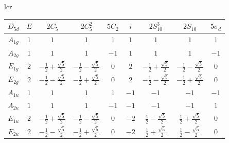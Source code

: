 \documentclass[landscape]{article}
\begin{document}
\begin{center}
        \begin{tabular}{lcr}
            \begin{minipage}[c]{0.4\linewidth}
                \begin{center}
                    \begin{tabular}{c|cccccccc}
                        $D_{5d}$ & $E$ & $2C_5$ & $2C_5^2$ & $5C_2$ & $i$ & $2S_{10}^3$ & $2S_{10}$ & $5\sigma_d$\\
                        \hline
                        $A_{1g}$ & $1$ & $1$ & $1$ & $1$ & $1$ & $1$ & $1$ & $1$\\
                        $A_{2g}$ & $1$ & $1$ & $1$ & $-1$ & $1$ & $1$ & $1$ & $-1$\\
                        $E_{1g}$ & $2$ & $-\frac12+\frac{\sqrt{5}}{2}$ & $-\frac12-\frac{\sqrt{5}}{2}$ & $0$ & $2$ & $-\frac12+\frac{\sqrt{5}}{2}$ & $-\frac12-\frac{\sqrt{5}}{2}$ & $0$\\
                        $E_{2g}$ & $2$ & $-\frac12-\frac{\sqrt{5}}{2}$ & $-\frac12+\frac{\sqrt{5}}{2}$ & $0$ & $2$ & $-\frac12-\frac{\sqrt{5}}{2}$ & $-\frac12+\frac{\sqrt{5}}{2}$ & $0$\\
                        $A_{1u}$ & $1$ & $1$ & $1$ & $1$ & $-1$ & $-1$ & $-1$ & $-1$\\
                        $A_{2u}$ & $1$ & $1$ & $1$ & $-1$ & $-1$ & $-1$ & $-1$ & $1$\\
                        $E_{1u}$ & $2$ & $-\frac12+\frac{\sqrt{5}}{2}$ & $-\frac12-\frac{\sqrt{5}}{2}$ & $0$ & $-2$ & $\frac12-\frac{\sqrt{5}}{2}$ & $\frac12+\frac{\sqrt{5}}{2}$ & $0$\\
                        $E_{2u}$ & $2$ & $-\frac12-\frac{\sqrt{5}}{2}$ & $-\frac12+\frac{\sqrt{5}}{2}$ & $0$ & $-2$ & $\frac12+\frac{\sqrt{5}}{2}$ & $\frac12-\frac{\sqrt{5}}{2}$ & $0$\\
                    \end{tabular}
                \end{center}
                \vspace{1cm}
                

\end{minipage}
\end{tabular}
\end{center}
\end{document}
